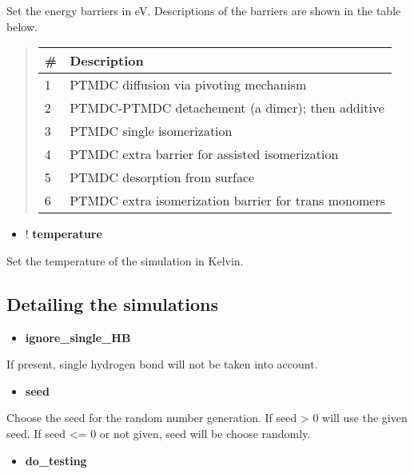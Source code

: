 \documentclass[letterpaper,10pt,english]{sphinxmanual}
\begin{document}
Set the energy barriers in eV. Descriptions of the barriers are shown in the table
below.
\begin{quote}

\begin{tabulary}{\linewidth}{|L|L|}
\hline
\textbf{
\#
} & \textbf{
Description
}\\\hline

1
 & 
PTMDC diffusion via pivoting mechanism
\\\hline

2
 & 
PTMDC-PTMDC detachement (a dimer); then additive
\\\hline

3
 & 
PTMDC single isomerization
\\\hline

4
 & 
PTMDC extra barrier for assisted isomerization
\\\hline

5
 & 
PTMDC desorption from surface
\\\hline

6
 & 
PTMDC extra isomerization barrier for trans monomers
\\\hline
\end{tabulary}

\end{quote}
\begin{itemize}
\item {} 
! \textbf{temperature} 

\end{itemize}

Set the temperature of the simulation in Kelvin.


\subsection{Detailing the simulations}
\label{keywords:detailing-the-simulations}\begin{itemize}
\item {} 
\textbf{ignore\_single\_HB}

\end{itemize}

If present, single hydrogen bond will not be taken into account.
\begin{itemize}
\item {} 
\textbf{seed} 

\end{itemize}

Choose the seed for the random number generation. If seed \textgreater{} 0 will use the
given seed. If seed \textless{}= 0 or not given, seed will be choose randomly.
\begin{itemize}
\item {} 
\textbf{do\_testing}

\end{itemize}
\end{document}
